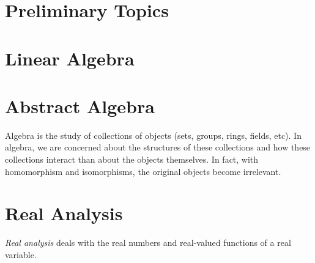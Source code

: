 \documentclass[11pt,a4paper,oneside]{book}
\newif\ifprelim
\newif\ifalg
\newif\ifanalysis
\newif\iftop
\begin{document}
\prelimtrue %
\algtrue %
\analysistrue %
\toptrue %



\tableofcontents
\pagebreak



\mainmatter
\ifprelim
    \part{Preliminary Topics}\label{part:prelim}
    
    
\fi

\ifalg
    \part{Linear Algebra}\label{part:linear-algebra}
    
    
    
    
    
    
    
%    
\fi

\ifalg
    \part{Abstract Algebra}\label{part:abstract-algebra}
    Algebra is the study of collections of objects (sets, groups, rings, fields, etc). In algebra, we are concerned about the structures of these collections and how these collections interact than about the objects themselves. In fact, with homomorphism and isomorphisms, the original objects become irrelevant.
    
    
    
\fi

\ifanalysis
    \part{Real Analysis}\label{part:real-analysis}
    \emph{Real analysis} deals with the real numbers and real-valued functions of a real variable.
\end{document}
